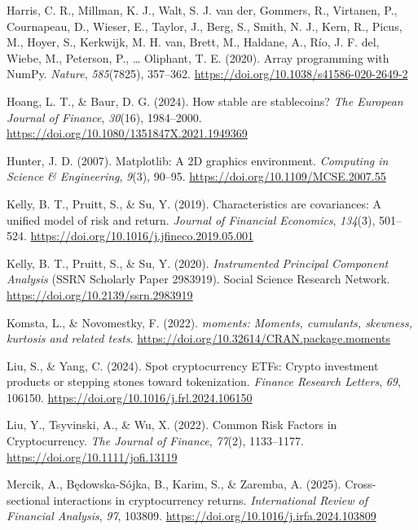 \documentclass[
  12pt,
  a4paper,
  openany]{scrbook}
\newlength{\cslhangindent}
\newenvironment{CSLReferences}[2] %
 {\begin{list}{}{%
  \setlength{\itemindent}{0pt}
  \setlength{\leftmargin}{0pt}
  \setlength{\parsep}{0pt}
  \ifodd #1
   \setlength{\leftmargin}{\cslhangindent}
   \setlength{\itemindent}{-1\cslhangindent}
  \fi
  \setlength{\itemsep}{#2\baselineskip}}}
 {\end{list}}
\begin{document}
\begin{CSLReferences}{1}{0}
Harris, C. R., Millman, K. J., Walt, S. J. van der, Gommers, R.,
Virtanen, P., Cournapeau, D., Wieser, E., Taylor, J., Berg, S., Smith,
N. J., Kern, R., Picus, M., Hoyer, S., Kerkwijk, M. H. van, Brett, M.,
Haldane, A., Río, J. F. del, Wiebe, M., Peterson, P., \ldots{} Oliphant,
T. E. (2020). Array programming with {NumPy}. \emph{Nature},
\emph{585}(7825), 357--362.
\url{https://doi.org/10.1038/s41586-020-2649-2}

Hoang, L. T., \& Baur, D. G. (2024). How stable are stablecoins?
\emph{The European Journal of Finance}, \emph{30}(16), 1984--2000.
\url{https://doi.org/10.1080/1351847X.2021.1949369}

Hunter, J. D. (2007). Matplotlib: A 2D graphics environment.
\emph{Computing in Science \& Engineering}, \emph{9}(3), 90--95.
\url{https://doi.org/10.1109/MCSE.2007.55}

Kelly, B. T., Pruitt, S., \& Su, Y. (2019). Characteristics are
covariances: A unified model of risk and return. \emph{Journal of
Financial Economics}, \emph{134}(3), 501--524.
\url{https://doi.org/10.1016/j.jfineco.2019.05.001}

Kelly, B. T., Pruitt, S., \& Su, Y. (2020). \emph{Instrumented Principal
Component Analysis} (SSRN Scholarly Paper 2983919). Social Science
Research Network. \url{https://doi.org/10.2139/ssrn.2983919}

Komsta, L., \& Novomestky, F. (2022). \emph{{moments}: Moments,
cumulants, skewness, kurtosis and related tests}.
\url{https://doi.org/10.32614/CRAN.package.moments}

Liu, S., \& Yang, C. (2024). Spot cryptocurrency ETFs: Crypto investment
products or stepping stones toward tokenization. \emph{Finance Research
Letters}, \emph{69}, 106150.
\url{https://doi.org/10.1016/j.frl.2024.106150}

Liu, Y., Tsyvinski, A., \& Wu, X. (2022). Common Risk Factors in
Cryptocurrency. \emph{The Journal of Finance}, \emph{77}(2), 1133--1177.
\url{https://doi.org/10.1111/jofi.13119}

Mercik, A., Będowska-Sójka, B., Karim, S., \& Zaremba, A. (2025).
Cross-sectional interactions in cryptocurrency returns.
\emph{International Review of Financial Analysis}, \emph{97}, 103809.
\url{https://doi.org/10.1016/j.irfa.2024.103809}


\end{CSLReferences}
\end{document}
